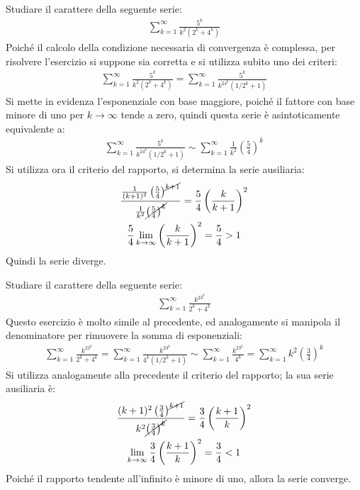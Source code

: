 \documentclass{article}
\numberwithin{equation}{subsection}
\begin{document}
Studiare il carattere della seguente serie:
\begin{gather*}
    \displaystyle\sum_{k=1}^\infty\frac{5^k}{k^2(2^k+4^k)}
\end{gather*}
Poiché il calcolo della condizione necessaria di convergenza è complessa, per risolvere l'esercizio si suppone sia corretta e si utilizza subito uno dei criteri:
\begin{gather*}
    \displaystyle\sum_{k=1}^\infty\frac{5^k}{k^2(2^k+4^k)}=
    \displaystyle\sum_{k=1}^\infty\frac{5^k}{k^24^k(1/2^k+1)}
\end{gather*}
Si mette in evidenza l'esponenziale con base maggiore, poiché il fattore con base minore di uno per $k\to\infty$ tende a zero, quindi questa serie è asintoticamente equivalente a:
\begin{gather*}
    \displaystyle\sum_{k=1}^\infty\frac{5^k}{k^24^k(1/2^k+1)}\sim
    \displaystyle\sum_{k=1}^\infty\frac{1}{k^2}\left(\frac{5}{4}\right)^k
\end{gather*}
Si utilizza ora il criterio del rapporto, si determina la serie ausiliaria:
\begin{gather*}
    \displaystyle\frac{\frac{1}{(k+1)^2}\left(\frac{5}{4}\right)^{\cancel{k+1}}}{\frac{1}{k^2}\cancel{\left(\frac{5}{4}\right)^k}}=\frac{5}{4}\left(\frac{k}{k+1}\right)^2\\
    \frac{5}{4}\lim_{k\to\infty}\left(\frac{k}{k+1}\right)^2=\frac{5}{4}>1
\end{gather*}
Quindi la serie diverge.  


Studiare il carattere della seguente serie:
\begin{gather*}
    \displaystyle\sum_{k=1}^\infty\frac{k^23^k}{2^k+4^k}
\end{gather*}
Questo esercizio è molto simile al precedente, ed analogamente si manipola il denominatore per rimuovere la somma di esponenziali:
\begin{gather*}
    \displaystyle\sum_{k=1}^\infty\frac{k^23^k}{2^k+4^k}=
    \displaystyle\sum_{k=1}^\infty\frac{k^23^k}{4^k(1/2^k+1)}\sim
    \displaystyle\sum_{k=1}^\infty\frac{k^23^k}{4^k}=
    \displaystyle\sum_{k=1}^\infty k^2\left(\frac{3}{4}\right)^k
\end{gather*}
Si utilizza analogamente alla precedente il criterio del rapporto; la sua serie ausiliaria è:
\begin{gather*}
    \displaystyle\frac{(k+1)^2\left(\frac{3}{4}\right)^{\cancel{k+1}}}{k^2\cancel{\left(\frac{3}{4}\right)^k}}=\frac{3}{4}\left(\frac{k+1}{k}\right)^2\\
    \lim_{k\to\infty}\frac{3}{4}\left(\frac{k+1}{k}\right)^2=\frac{3}{4}<1
\end{gather*}
Poiché il rapporto tendente all'infinito è minore di uno, allora la serie converge. 
\end{document}

